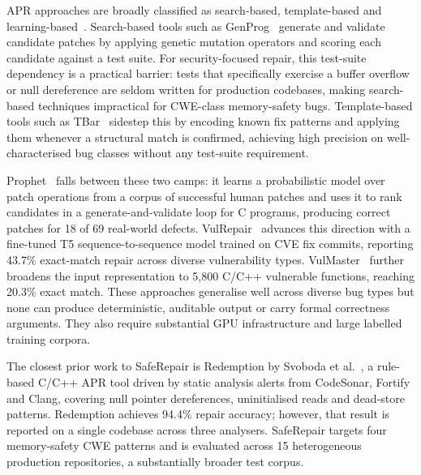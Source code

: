 \documentclass[conference]{IEEEtran}
\begin{document}
APR approaches are broadly classified as search-based, template-based and
learning-based~\cite{b1}. Search-based tools such as GenProg~\cite{b8} generate
and validate candidate patches by applying genetic mutation operators and scoring
each candidate against a test suite. For security-focused repair, this test-suite dependency is a practical barrier:
tests that specifically exercise a buffer overflow or null dereference are seldom
written for production codebases, making search-based techniques impractical for
CWE-class memory-safety bugs.
Template-based tools such as TBar~\cite{b10} sidestep this by encoding known
fix patterns and applying them whenever a structural match is confirmed, achieving
high precision on well-characterised bug classes without any test-suite requirement.

Prophet~\cite{b11} falls between these two camps: it learns a probabilistic model
over patch operations from a corpus of successful human patches and uses it to rank
candidates in a generate-and-validate loop for C programs, producing correct patches
for 18 of 69 real-world defects. VulRepair~\cite{b4} advances this direction with
a fine-tuned T5 sequence-to-sequence model trained on CVE fix commits, reporting
43.7\% exact-match repair across diverse vulnerability types. VulMaster~\cite{b3}
further broadens the input representation to 5,800 C/C++ vulnerable functions,
reaching 20.3\% exact match. These approaches generalise well across diverse bug
types but none can produce deterministic, auditable output or carry formal
correctness arguments. They also require substantial GPU infrastructure and large
labelled training corpora.

The closest prior work to SafeRepair is Redemption by Svoboda et al.~\cite{b2},
a rule-based C/C++ APR tool driven by static analysis alerts from CodeSonar,
Fortify and Clang, covering null pointer dereferences, uninitialised reads and
dead-store patterns. Redemption achieves 94.4\% repair accuracy; however, that
result is reported on a single codebase across three analysers. SafeRepair targets
four memory-safety CWE patterns and is evaluated across 15 heterogeneous production
repositories, a substantially broader test corpus.
\end{document}
